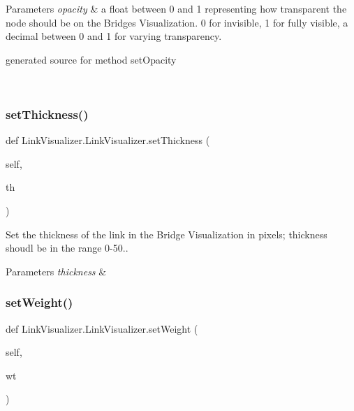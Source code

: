 \begin{DoxyParams}{Parameters}
{\em opacity} & a float between 0 and 1 representing how transparent the node should be on the Bridges Visualization. 0 for invisible, 1 for fully visible, a decimal between 0 and 1 for varying transparency.\begin{DoxyVerb}generated source for method setOpacity \end{DoxyVerb}
 \\
\hline
\end{DoxyParams}
\hypertarget{class_link_visualizer_1_1_link_visualizer_a2ceb405cd49aae8d9b21f98a9b3bb0de}{}\label{class_link_visualizer_1_1_link_visualizer_a2ceb405cd49aae8d9b21f98a9b3bb0de} 
\subsubsection{\texorpdfstring{set\+Thickness()}{setThickness()}}
{\footnotesize\ttfamily def Link\+Visualizer.\+Link\+Visualizer.\+set\+Thickness (\begin{DoxyParamCaption}\item[{}]{self,  }\item[{}]{th }\end{DoxyParamCaption})}



Set the thickness of the link in the Bridge Visualization in pixels; thickness shoudl be in the range 0-\/50.. 


\begin{DoxyParams}{Parameters}
{\em thickness} & \\
\hline
\end{DoxyParams}
\hypertarget{class_link_visualizer_1_1_link_visualizer_add17648c2235c5c712f0ef5139d96454}{}\label{class_link_visualizer_1_1_link_visualizer_add17648c2235c5c712f0ef5139d96454} 
\subsubsection{\texorpdfstring{set\+Weight()}{setWeight()}}
{\footnotesize\ttfamily def Link\+Visualizer.\+Link\+Visualizer.\+set\+Weight (\begin{DoxyParamCaption}\item[{}]{self,  }\item[{}]{wt }\end{DoxyParamCaption})}



